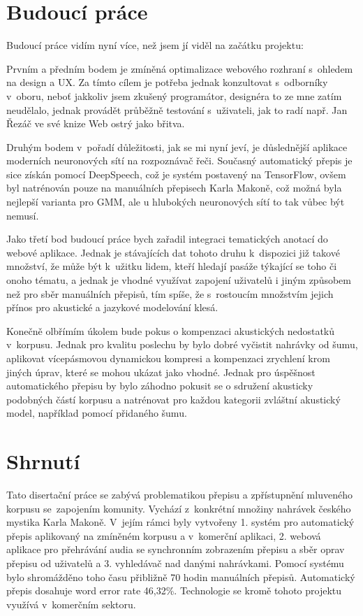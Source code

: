 \section{Budoucí práce}

Budoucí práce vidím nyní více, než jsem jí viděl na začátku projektu:

Prvním a předním bodem je zmíněná optimalizace webového rozhraní s~ohledem na
design a UX. Za tímto cílem je potřeba jednak konzultovat s~odborníky v~oboru,
neboť jakkoliv jsem zkušený programátor, designéra to ze mne zatím neudělalo, jednak provádět průběžně testování
s~uživateli, jak to radí např. Jan Řezáč ve své knize Web ostrý jako
břitva\cite{rezac2016web}.

Druhým bodem v~pořadí důležitosti, jak se mi nyní jeví, je důslednější aplikace
moderních neuronových sítí na rozpoznávač řeči. Současný automatický přepis je
sice získán pomocí DeepSpeech, což je systém postavený na TensorFlow, ovšem byl
natrénován pouze na manuálních
přepisech Karla Makoně, což možná byla nejlepší varianta pro GMM, ale u
hlubokých neuronových sítí to tak vůbec být nemusí.

Jako třetí bod budoucí práce bych zařadil integraci tematických anotací do
webové aplikace. Jednak je stávajících dat tohoto druhu k~dispozici již takové
množství, že může být k~užitku lidem, kteří hledají pasáže týkající se toho či
onoho tématu, a jednak je vhodné využívat zapojení uživatelů i jiným způsobem
než pro sběr manuálních přepisů, tím spíše, že s~rostoucím množstvím jejich
přínos pro akustické a jazykové modelování klesá.

Konečně olbřímím úkolem bude pokus o kompenzaci akustických nedostatků
v~korpusu. Jednak pro kvalitu poslechu by bylo dobré vyčistit nahrávky od šumu,
aplikovat vícepásmovou dynamickou kompresi a kompenzaci zrychlení krom jiných
úprav, které se mohou ukázat jako vhodné. Jednak pro úspěšnost automatického
přepisu by bylo záhodno pokusit se o sdružení akusticky podobných částí korpusu
a natrénovat pro každou kategorii zvláštní akustický model, například pomocí
přidaného šumu.\cite{zur2009noise}\cite{VARGA1993247}

\section{Shrnutí}

Tato disertační práce se zabývá problematikou přepisu a zpřístupnění mluveného
korpusu se~zapojením komunity. Vychází z~konkrétní množiny nahrávek českého mystika Karla Makoně.
V~jejím rámci byly vytvořeny 1. systém pro automatický přepis aplikovaný na zmíněném
korpusu a v~komerční aplikaci, 2. webová aplikace pro přehrávání audia se
synchronním zobrazením přepisu a sběr oprav přepisu od uživatelů a 3.
vyhledávač nad danými nahrávkami. Pomocí systému bylo shromážděno toho času
přibližně 70 hodin manuálních přepisů. Automatický přepis dosahuje word error
rate 46,32\%. Technologie se kromě tohoto projektu využívá v~komerčním sektoru.

